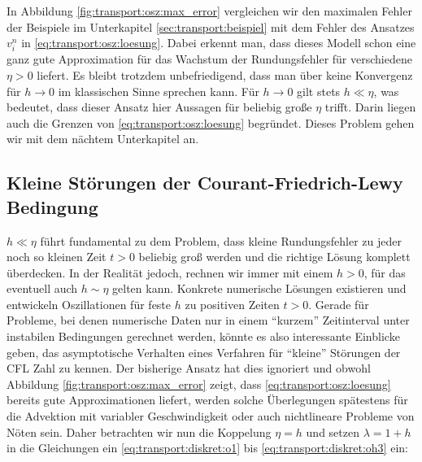 In Abbildung \ref{fig:transport:osz:max_error} vergleichen wir den maximalen Fehler der Beispiele im Unterkapitel \ref{sec:transport:beispiel} mit dem Fehler des Ansatzes $v^n_i$ in \eqref{eq:transport:osz:loesung}.
Dabei erkennt man, dass dieses Modell schon eine ganz gute Approximation für das Wachstum der Rundungsfehler für verschiedene $\eta > 0$ liefert.
Es bleibt trotzdem unbefriedigend, dass man über keine Konvergenz für $h \to 0$ im klassischen Sinne sprechen kann.
Für $h \to 0$ gilt stets $h \ll \eta$, was bedeutet, dass dieser Ansatz hier Aussagen für beliebig große $\eta$ trifft.
Darin liegen auch die Grenzen von \eqref{eq:transport:osz:loesung} begründet.
Dieses Problem gehen wir mit dem nächtem Unterkapitel an.

\subsection{Kleine Störungen der Courant-Friedrich-Lewy Bedingung}\label{sec:transport:kleineta}

$h \ll \eta$ führt fundamental zu dem Problem, dass kleine Rundungsfehler zu jeder noch so kleinen Zeit $t > 0$ beliebig groß werden und die richtige Lösung komplett überdecken.
In der Realität jedoch, rechnen wir immer mit einem $h > 0$, für das eventuell auch $h \sim \eta$ gelten kann.
Konkrete numerische Lösungen existieren und entwickeln Oszillationen für feste $h$ zu positiven Zeiten $t > 0$.
Gerade für Probleme, bei denen numerische Daten nur in einem ``kurzem'' Zeitinterval unter instabilen Bedingungen gerechnet werden, könnte es also interessante Einblicke geben, das asymptotische Verhalten eines Verfahren für ``kleine'' Störungen der CFL Zahl zu kennen.
Der bisherige Ansatz hat dies ignoriert und obwohl Abbildung \ref{fig:transport:osz:max_error} zeigt, dass \eqref{eq:transport:osz:loesung} bereits gute Approximationen liefert, werden solche Überlegungen spätestens für die Advektion mit variabler Geschwindigkeit oder auch nichtlineare Probleme von Nöten sein.
Daher betrachten wir nun die Koppelung $\eta = h$ und setzen $\lambda = 1 + h$ in die Gleichungen ein \eqref{eq:transport:diskret:o1} bis \eqref{eq:transport:diskret:oh3} ein:

